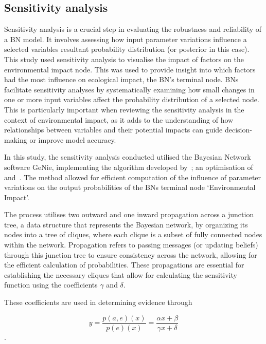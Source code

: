 \documentclass[10pt,letterpaper]{article}
\begin{document}
\subsection*{Sensitivity analysis}

Sensitivity analysis is a crucial step in evaluating the robustness and reliability of a BN model. It involves assessing how input parameter variations influence a selected variables resultant probability distribution (or posterior in this case). This study used sensitivity analysis to visualise the impact of factors on the environmental impact node. This was used to provide insight into which factors had the most influence on ecological impact, the BN's terminal node. BNs facilitate sensitivity analyses by systematically examining how small changes in one or more input variables affect the probability distribution of a selected node. This is particularly important when reviewing the sensitivity analysis in the context of environmental impact, as it adds to the understanding of how relationships between variables and their potential impacts can guide decision-making or improve model accuracy.

In this study, the sensitivity analysis conducted utilised the Bayesian Network software GeNie, implementing the algorithm developed by~\cite{article}; an optimisation of~\cite{Castillo1996ANM} and~\cite{Gaag1998PracticableSA}. The method allowed for efficient computation of the influence of parameter variations on the output probabilities of the BNs terminal node `Environmental Impact'.

The process utilises two outward and one inward propagation across a junction tree, a data structure that represents the Bayesian network, by organizing its nodes into a tree of cliques, where each clique is a subset of fully connected nodes within the network. Propagation refers to passing messages (or updating beliefs) through this junction tree to ensure consistency across the network, allowing for the efficient calculation of probabilities. These propagations are essential for establishing the necessary cliques that allow for calculating the sensitivity function using the coefficients $\gamma$ and $\delta$.

These coefficients are used in determining evidence through

\begin{equation}
y = \frac{p(a, e)(x)}{p(e)(x)}=\frac{\alpha x + \beta}{\gamma x + \delta}
\end{equation}.
\end{document}
